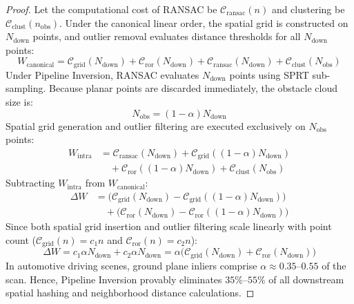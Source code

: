 \documentclass[journal,compsoc]{IEEEtran}
\begin{document}
\begin{proof}
Let the computational cost of RANSAC be $\mathcal{C}_{\text{ransac}}(n)$ and clustering be $\mathcal{C}_{\text{clust}}(n_{\text{obs}})$.
Under the canonical linear order, the spatial grid is constructed on $N_{\text{down}}$ points, and outlier removal evaluates distance thresholds for all $N_{\text{down}}$ points:
\begin{equation}
W_{\text{canonical}} = \mathcal{C}_{\text{grid}}(N_{\text{down}}) + \mathcal{C}_{\text{ror}}(N_{\text{down}}) + \mathcal{C}_{\text{ransac}}(N_{\text{down}}) + \mathcal{C}_{\text{clust}}(N_{\text{obs}})
\end{equation}
Under Pipeline Inversion, RANSAC evaluates $N_{\text{down}}$ points using SPRT sub-sampling. Because planar points are discarded immediately, the obstacle cloud size is:
\begin{equation}
N_{\text{obs}} = (1 - \alpha) N_{\text{down}}
\end{equation}
Spatial grid generation and outlier filtering are executed exclusively on $N_{\text{obs}}$ points:
\begin{align}
W_{\text{intra}} &= \mathcal{C}_{\text{ransac}}(N_{\text{down}}) + \mathcal{C}_{\text{grid}}((1 - \alpha) N_{\text{down}}) \nonumber \\
&\quad + \mathcal{C}_{\text{ror}}((1 - \alpha) N_{\text{down}}) + \mathcal{C}_{\text{clust}}(N_{\text{obs}})
\end{align}
Subtracting $W_{\text{intra}}$ from $W_{\text{canonical}}$:
\begin{align}
\Delta W &= \Big( \mathcal{C}_{\text{grid}}(N_{\text{down}}) - \mathcal{C}_{\text{grid}}((1 - \alpha) N_{\text{down}}) \Big) \nonumber \\
&\quad + \Big( \mathcal{C}_{\text{ror}}(N_{\text{down}}) - \mathcal{C}_{\text{ror}}((1 - \alpha) N_{\text{down}}) \Big)
\end{align}
Since both spatial grid insertion and outlier filtering scale linearly with point count ($\mathcal{C}_{\text{grid}}(n) = c_1 n$ and $\mathcal{C}_{\text{ror}}(n) = c_2 n$):
\begin{equation}
\Delta W = c_1 \alpha N_{\text{down}} + c_2 \alpha N_{\text{down}} = \alpha \Big( \mathcal{C}_{\text{grid}}(N_{\text{down}}) + \mathcal{C}_{\text{ror}}(N_{\text{down}}) \Big)
\end{equation}
In automotive driving scenes, ground plane inliers comprise $\alpha \approx 0.35\text{--}0.55$ of the scan. Hence, Pipeline Inversion provably eliminates $35\%\text{--}55\%$ of all downstream spatial hashing and neighborhood distance calculations.
\end{proof}
\end{document}
